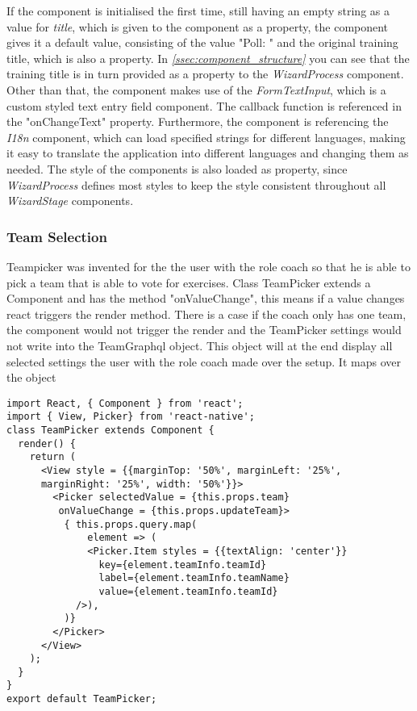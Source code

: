 If the component is initialised the first time, still having an empty string as a value for \textit{title}, which is given to the component as a property, the component gives it a default value, consisting of the value "Poll: " and the original training title, which is also a property. In \textit{\ref{ssec:component_structure} } you can see that the training title is in turn provided as a property to the \textit{WizardProcess} component.
\newline
Other than that, the component makes use of the \textit{FormTextInput}, which is a custom styled text entry field component. The callback function is referenced in the "onChangeText" property. Furthermore, the component is referencing the \textit{I18n} component, which can load specified strings for different languages, making it easy to translate the application into different languages and changing them as needed. The style of the components is also loaded as property, since \textit{WizardProcess} defines most styles to keep the style consistent throughout all \textit{WizardStage} components.

\subsubsection{Team Selection}
\label{sssec:poll_team}

Teampicker was invented for the the user with the role coach so that he is able to pick a team that is able to vote for exercises. Class TeamPicker extends a Component and has the method "onValueChange", this means if a value changes react triggers the render method. There is a case if the coach only has one team, the component would not trigger the render and the TeamPicker settings would not write into the TeamGraphql object. This object will at the end display all selected settings the user with the role coach made over the setup. It maps over the object 

\begin{lstlisting}
import React, { Component } from 'react';
import { View, Picker} from 'react-native';
class TeamPicker extends Component {
  render() {
    return (
      <View style = {{marginTop: '50%', marginLeft: '25%',
      marginRight: '25%', width: '50%'}}>
        <Picker selectedValue = {this.props.team}
         onValueChange = {this.props.updateTeam}>
          { this.props.query.map(
              element => (
              <Picker.Item styles = {{textAlign: 'center'}}
                key={element.teamInfo.teamId}
                label={element.teamInfo.teamName}
                value={element.teamInfo.teamId}
            />),
          )}
        </Picker>
      </View>
    );
  }
}
export default TeamPicker;
\end{lstlisting}

